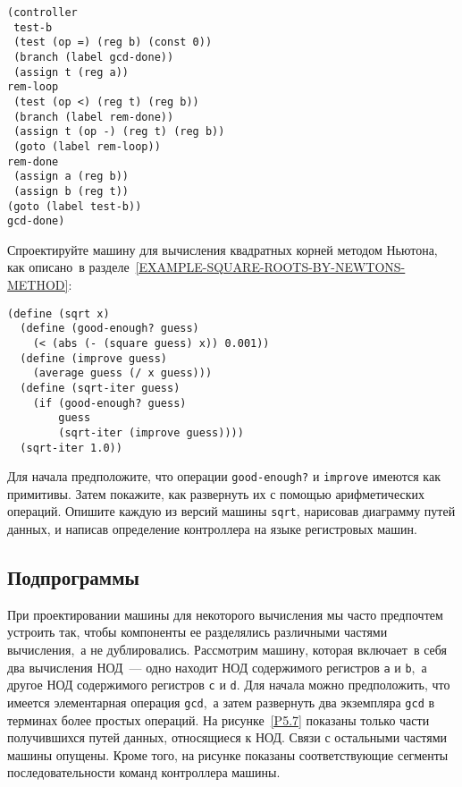 \begin{cntrfig}
\begin{Verbatim}[fontsize=\small]
(controller
 test-b
 (test (op =) (reg b) (const 0))
 (branch (label gcd-done))
 (assign t (reg a))
rem-loop
 (test (op <) (reg t) (reg b))
 (branch (label rem-done))
 (assign t (op -) (reg t) (reg b))
 (goto (label rem-loop))
rem-done
 (assign a (reg b))
 (assign b (reg t))
(goto (label test-b))
gcd-done)
\end{Verbatim}
\caption{Последовательность команд контроллера машины
НОД с рисунка~\ref{P5.5}.}
\label{P5.6}

\end{cntrfig}
\begin{exercise}{5.3}%
\label{EX5.3}%
Спроектируйте машину для вычисления квадратных корней
методом Ньютона, как описано~в 
разделе~\ref{EXAMPLE-SQUARE-ROOTS-BY-NEWTONS-METHOD}:
\samepage
\begin{Verbatim}[fontsize=\small]
(define (sqrt x)
  (define (good-enough? guess)
    (< (abs (- (square guess) x)) 0.001))
  (define (improve guess)
    (average guess (/ x guess)))
  (define (sqrt-iter guess)
    (if (good-enough? guess)
        guess
        (sqrt-iter (improve guess))))
  (sqrt-iter 1.0))
\end{Verbatim}
Для начала предположите, что операции {\tt good-enough?} и
{\tt improve} имеются как примитивы. Затем покажите, как
развернуть их с помощью арифметических операций.  Опишите каждую из
версий машины {\tt sqrt}, нарисовав диаграмму путей данных, и
написав определение контроллера на языке регистровых машин.
\end{exercise}

\subsection{Подпрограммы}
\label{SUBROUTINES}

При проектировании машины для некоторого вычисления мы
часто предпочтем устроить так, чтобы компоненты ее разделялись
различными частями вычисления,~а не дублировались.  Рассмотрим машину,
которая включает~в себя два вычисления НОД~--- одно находит НОД
содержимого регистров {\tt a} и {\tt b},~а другое НОД
содержимого регистров {\tt c} и {\tt d}.  Для начала
можно предположить, что имеется элементарная операция
{\tt gcd},~а затем развернуть два экземпляра {\tt gcd} в
терминах более простых операций.  На рисунке~\ref{P5.7}
показаны только части получившихся путей данных, относящиеся к НОД.
Связи с остальными частями машины опущены.  Кроме того, на рисунке
показаны соответствующие сегменты последовательности команд
контроллера машины.


